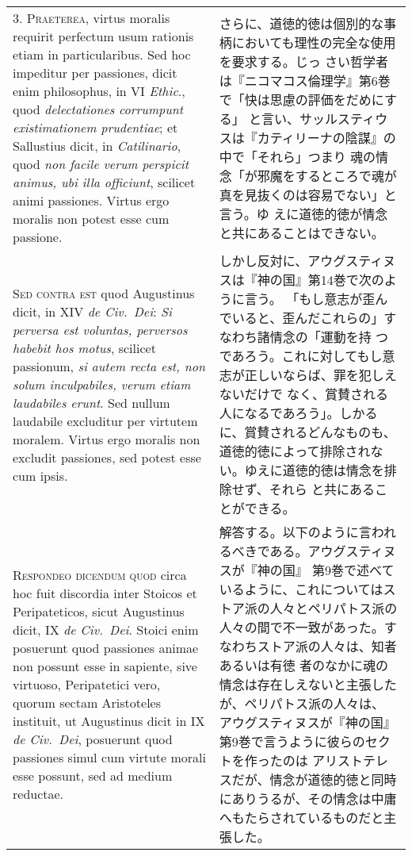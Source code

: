 \documentclass[10pt]{jsarticle}
\begin{document}
\begin{longtable}{p{21em}p{21em}}
3. {\scshape Praeterea}, virtus moralis requirit perfectum usum
rationis etiam in particularibus. Sed hoc impeditur per passiones,
dicit enim philosophus, in VI {\itshape Ethic}., quod {\itshape
delectationes corrumpunt existimationem prudentiae}; et Sallustius
dicit, in {\itshape Catilinario}, quod {\itshape non facile verum
perspicit animus, ubi illa officiunt}, scilicet animi
passiones. Virtus ergo moralis non potest esse cum passione.


&

さらに、道徳的徳は個別的な事柄においても理性の完全な使用を要求する。じっ
さい哲学者は『ニコマコス倫理学』第6巻で「快は思慮の評価をだめにする」
と言い、サッルスティウスは『カティリーナの陰謀』の中で「それら」つまり
魂の情念「が邪魔をするところで魂が真を見抜くのは容易でない」と言う。ゆ
えに道徳的徳が情念と共にあることはできない。
 
\\



{\scshape Sed contra est} quod Augustinus dicit, in XIV {\itshape de
Civ.~Dei}: {\itshape Si perversa est voluntas, perversos habebit hos
motus}, scilicet passionum, {\itshape si autem recta est, non solum
inculpabiles, verum etiam laudabiles erunt}. Sed nullum laudabile
excluditur per virtutem moralem. Virtus ergo moralis non excludit
passiones, sed potest esse cum ipsis.

&

 しかし反対に、アウグスティヌスは『神の国』第14巻で次のように言う。
 「もし意志が歪んでいると、歪んだこれらの」すなわち諸情念の「運動を持
 つであろう。これに対してもし意志が正しいならば、罪を犯しえないだけで
 なく、賞賛される人になるであろう」。しかるに、賞賛されるどんなものも、
 道徳的徳によって排除されない。ゆえに道徳的徳は情念を排除せず、それら
 と共にあることができる。

 
\\



 {\scshape Respondeo dicendum quod} circa hoc fuit discordia inter
 Stoicos et Peripateticos, sicut Augustinus dicit, IX {\itshape de
 Civ.~Dei}. Stoici enim posuerunt quod passiones animae non possunt
 esse in sapiente, sive virtuoso, Peripatetici vero, quorum sectam
 Aristoteles instituit, ut Augustinus dicit in IX {\itshape de
 Civ.~Dei}, posuerunt quod passiones simul cum virtute morali esse
 possunt, sed ad medium reductae.



&


 解答する。以下のように言われるべきである。アウグスティヌスが『神の国』
 第9巻で述べているように、これについてはストア派の人々とペリパトス派の
 人々の間で不一致があった。すなわちストア派の人々は、知者あるいは有徳
 者のなかに魂の情念は存在しえないと主張したが、ペリパトス派の人々は、
 アウグスティヌスが『神の国』第9巻で言うように彼らのセクトを作ったのは
 アリストテレスだが、情念が道徳的徳と同時にありうるが、その情念は中庸
 へもたらされているものだと主張した。
 

\end{longtable}
\end{document}
